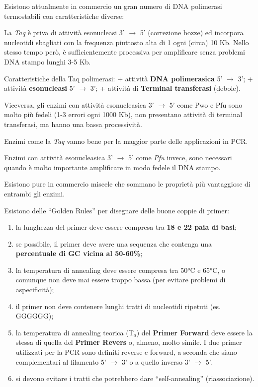 \documentclass[11pt]{book}
\begin{document}
Esistono attualmente in commercio un gran numero di DNA polimerasi
termostabili con caratteristiche diverse:

La \emph{Taq} è priva di attività esonucleasi 3' \(\rightarrow\) 5'
(correzione bozze) ed incorpora nucleotidi sbagliati con la frequenza
piuttosto alta di 1 ogni (circa) 10 Kb. Nello stesso tempo però, è
sufficientemente processiva per amplificare senza problemi DNA stampo
lunghi 3-5 Kb.

Caratteristiche della Taq polimerasi: + attività \textbf{DNA
polimerasica} 5' \(\rightarrow\) 3'; + attività \textbf{esonucleasi} 5'
\(\rightarrow\) 3'; + attività di \textbf{Terminal transferasi}
(debole).

Viceversa, gli enzimi con attività esonucleasica 3' \(\rightarrow\) 5'
come Pwo e Pfu sono molto più fedeli (1-3 errori ogni 1000 Kb), non
presentano attività di terminal transferasi, ma hanno una bassa
processività.

Enzimi come la \emph{Taq} vanno bene per la maggior parte delle
applicazioni in PCR.

Enzimi con attività esonucleasica 3' \(\rightarrow\) 5' come \emph{Pfu}
invece, sono necessari quando è molto importante amplificare in modo
fedele il DNA stampo.

Esistono pure in commercio miscele che sommano le proprietà più
vantaggiose di entrambi gli enzimi.

Esistono delle ``Golden Rules'' per disegnare delle buone coppie di
primer:

\begin{enumerate}
\def\labelenumi{\arabic{enumi}.}
\itemsep1pt\parskip0pt
\item
  la lunghezza del primer deve essere compresa tra \textbf{18 e 22 paia
  di basi};
\item
  se possibile, il primer deve avere una sequenza che contenga una
  \textbf{percentuale di GC vicina al 50-60\%};
\item
  la temperatura di annealing deve essere compresa tra 50°C e 65°C, o
  comunque non deve mai essere troppo bassa (per evitare problemi di
  aspecificità);
\item
  il primer non deve contenere lunghi tratti di nucleotidi ripetuti (es.
  GGGGGG);
\item
  la temperatura di annealing teorica (T\(_a\)) del \textbf{Primer
  Forward} deve essere la stessa di quella del \textbf{Primer Revers} o,
  almeno, molto simile. I due primer utilizzati per la PCR sono definiti
  reverse e forward, a seconda che siano complementari al filamento 5'
  \(\rightarrow\) 3' o a quello inverso 3' \(\rightarrow\) 5'.
\item
  si devono evitare i tratti che potrebbero dare ``self-annealing''
  (riassociazione).
\end{enumerate}
\end{document}
